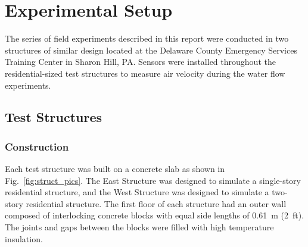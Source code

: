 \documentclass[12pt,oneside]{book}
\begin{document}
\section{Experimental Setup}
\label{sec:exp_setup}

The series of field experiments described in this report were conducted in two structures of similar design located at the Delaware County Emergency Services Training Center in Sharon Hill, PA. Sensors were installed throughout the residential-sized test structures to measure air velocity during the water flow experiments.  

\subsection{Test Structures}
\label{sec:test_structs}

\subsubsection{Construction}
\label{sec:construction}
Each test structure was built on a concrete slab as shown in Fig.~\ref{fig:struct_pics}. The East Structure was designed to simulate a single-story residential structure, and the West Structure was designed to simulate a two-story residential structure. The first floor of each structure had an outer wall composed of interlocking concrete blocks with equal side lengths of 0.61~m (2~ft). The joints and gaps between the blocks were filled with high temperature insulation.
\end{document}

